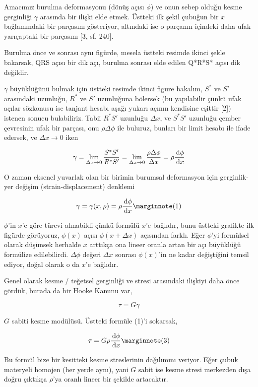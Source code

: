 \documentclass[12pt,fleqn]{article}\usepackage{../../common}
\begin{document}
Amacımız burulma deformasyonu (dönüş açısı $\phi$) ve onun sebep olduğu kesme
gerginliği $\gamma$ arasında bir ilişki elde etmek. Üstteki ilk şekil çubuğun
bir $x$ bağlamındaki bir parçasını gösteriyor, altındaki ise o parçanın içindeki
daha ufak yarıçaptaki bir parçasını [3, sf. 240].

Burulma önce ve sonrası aynı figürde, mesela üstteki resimde ikinci şekle
bakarsak, QRS açısı bir dik açı, burulma sonrası elde edilen Q*R*S* açısı
dik değildir.

$\gamma$ büyüklüğünü bulmak için üstteki resimde ikinci figure bakalım, $S^{\ast}$ ve
$S'$ arasındaki uzunluğu, $R^{\ast}$ ve $S'$ uzunluğuna bölersek (bu yapılabilir
çünkü ufak açılar sözkonusu ise tanjant hesabı aşağı yukarı açının kendisine
eşittir [2]) istenen sonucu bulabiliriz. Tabii $R^{\ast}S'$ uzunluğu $\Delta x$,
ve $S^{\ast}S'$ uzunluğu çember çevresinin ufak bir parçası, onu  $\rho \Delta \phi$
ile buluruz, bunları bir limit hesabı ile ifade edersek, ve $\Delta x \to 0$
iken

$$
\gamma = \lim_{\Delta x \to 0} \frac{S^{\ast}S'}{R^{\ast} S'} =
\lim_{\Delta x \to 0} \frac{\rho \Delta \phi}{\Delta x} =
\rho \frac{\,\mathrm{d} \phi}{\,\mathrm{d} x}
$$

O zaman eksenel yuvarlak olan bir birimin burumsal deformasyon için
gerginlik-yer değişim (strain-displacement) denklemi

$$
\gamma = \gamma(x,\rho) = \rho \frac{\ud \phi}{\ud x}
\mlabel{1}
$$

$\phi$'in $x$'e göre türevi alınabildi çünkü formülü $x$'e bağlıdır, bunu
üstteki grafikte ilk figürde görüyoruz, $\phi(x)$ açısı $\phi(x+\Delta x)$
açısından farklı. Eğer $\phi$'yi formülsel olarak düşünsek herhalde $x$ arttıkça
ona lineer oranla artan bir açı büyüklüğü formülize edilebilirdi. $\Delta \phi$
değeri $\Delta x$ sonrası $\phi(x)$'in ne kadar değiştiğini temsil ediyor,
doğal olarak o da $x$'e bağlıdır.

Genel olarak kesme / teğetsel gerginliği ve stresi arasındaki ilişkiyi daha önce
gördük, burada da bir Hooke Kanunu var,

$$
\tau = G \gamma
$$

$G$ sabiti kesme modülüsü. Üstteki formüle (1)'i sokarsak,

$$
\tau = G \rho \frac{\ud \phi}{\ud x}
\mlabel{3}
$$

Bu formül bize bir kesitteki kesme streslerinin dağılımını veriyor. Eğer
çubuk materyeli homojen (her yerde aynı), yani $G$ sabit ise kesme stresi
merkezden dışa doğru çıktıkça $\rho$'ya oranlı lineer bir şekilde artacaktır.
\end{document}
